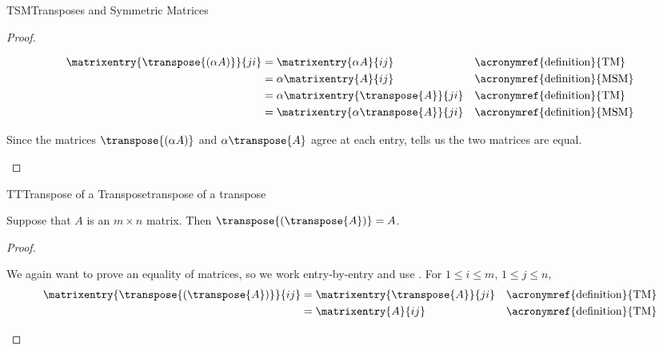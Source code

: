 \begin{subsect}{TSM}{Transposes and Symmetric Matrices}
\begin{proof}
\begin{para}
%
\begin{align*}
\matrixentry{\transpose{(\alpha A)}}{ji}&=
\matrixentry{\alpha A}{ij}&&\text{\acronymref{definition}{TM}}\\
&=\alpha\matrixentry{A}{ij}&&\text{\acronymref{definition}{MSM}}\\
&=\alpha\matrixentry{\transpose{A}}{ji}&&\text{\acronymref{definition}{TM}}\\
&=\matrixentry{\alpha\transpose{A}}{ji}&&\text{\acronymref{definition}{MSM}}
\end{align*}\end{para}
%
\begin{para}Since the matrices $\transpose{(\alpha A)}$ and $\alpha\transpose{A}$ agree at each entry,  tells us the two matrices are equal.\end{para}
%
\end{proof}
%
\begin{theorem}{TT}{Transpose of a Transpose}{transpose of a transpose}
\begin{para}Suppose that $A$ is an $m\times n$ matrix.  Then $\transpose{\left(\transpose{A}\right)}=A$.\end{para}
%
\end{theorem}
%
\begin{proof}
\begin{para}We again want to prove an equality of matrices, so we work entry-by-entry and use .  For $1\leq i\leq m$, $1\leq j\leq n$,
%
\begin{align*}
%
\matrixentry{\transpose{\left(\transpose{A}\right)}}{ij}
&=\matrixentry{\transpose{A}}{ji}&&\text{\acronymref{definition}{TM}}\\
&=\matrixentry{A}{ij}&&\text{\acronymref{definition}{TM}}
%
\end{align*}
\end{para}
%
\end{proof}
%
\end{subsect}
%
